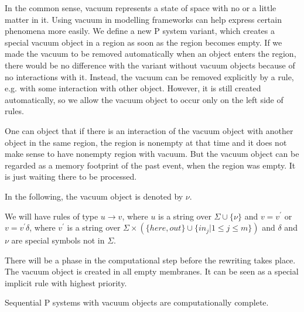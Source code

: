 In the common sense, vacuum represents a state of space with no or a little matter in it. Using vacuum in modelling frameworks can help express certain phenomena more easily. We define a new P system variant, which creates a special vacuum object in a region as soon as the region becomes empty.
If we made the vacuum to be removed automatically when an object enters the region, there would be no difference with the variant without vacuum objects because of no interactions with it. Instead, the vacuum can be removed explicitly by a rule, e.g. with some interaction with other object. However, it is still created automatically, so we allow the vacuum object to occur only on the left side of rules.

One can object that if there is an interaction of the vacuum object with another object in the same region, the region is nonempty at that time and it does not make sense to have nonempty region with vacuum. But the vacuum object can be regarded as a memory footprint of the past event, when the region was empty. It is just waiting there to be processed.

In the following, the vacuum object is denoted by $\nu$.

We will have rules of type $u\rightarrow v$, where $u$ is a string over $\Sigma\cup\{\nu\}$ and $v=v^\prime$ or $v=v^\prime\delta$, where $v^\prime$ is a string over $\Sigma\times(\{here, out\}\cup\{in_j|1\leq j\leq m\})$ and $\delta$ and $\nu$ are special symbols not in $\Sigma$.

There will be a phase in the computational step before the rewriting takes place. The vacuum object is created in all empty membranes. It can be seen as a special implicit rule with highest priority.

\begin{veta}
  Sequential P systems with vacuum objects are computationally complete.
\end{veta}

